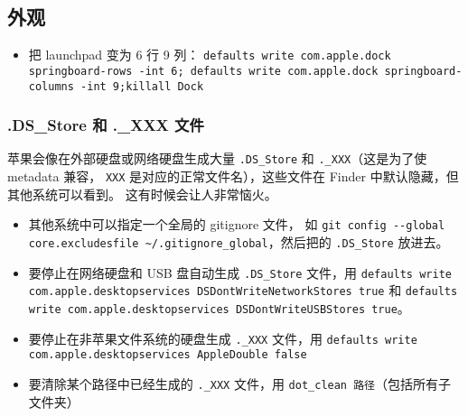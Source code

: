 \subsection{外观}
\begin{itemize}
\item 把 launchpad 变为 6 行 9 列： \verb`defaults write com.apple.dock springboard-rows -int 6; defaults write com.apple.dock springboard-columns -int 9;killall Dock`
\end{itemize}

\subsubsection{.DS_Store 和 ._XXX 文件}
苹果会像在外部硬盘或网络硬盘生成大量 \verb`.DS_Store` 和 \verb`._XXX`（这是为了使 metadata 兼容， \verb`XXX` 是对应的正常文件名），这些文件在 Finder 中默认隐藏，但其他系统可以看到。 这有时候会让人非常恼火。
\begin{itemize}
\item 其他系统中可以指定一个全局的 gitignore 文件， 如 \verb|git config --global core.excludesfile ~/.gitignore_global|，然后把的 \verb`.DS_Store` 放进去。
\item 要停止在网络硬盘和 USB 盘自动生成 \verb`.DS_Store` 文件，用 \verb`defaults write com.apple.desktopservices DSDontWriteNetworkStores true` 和 \verb`defaults write com.apple.desktopservices DSDontWriteUSBStores true`。
\item 要停止在非苹果文件系统的硬盘生成 \verb`._XXX` 文件，用 \verb`defaults write com.apple.desktopservices AppleDouble false`
\item 要清除某个路径中已经生成的 \verb`._XXX` 文件，用 \verb`dot_clean 路径`（包括所有子文件夹）
\end{itemize}

